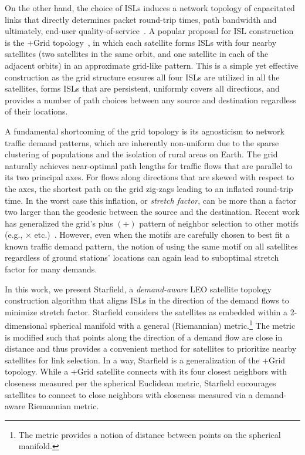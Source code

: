 \documentclass[acmsmall, screen]{acmart}
\begin{document}
On the other hand, the choice of ISLs induces a network topology of capacitated links that directly determines packet round-trip times, path bandwidth and ultimately, end-user quality-of-service~\cite{chen20243}. A popular proposal for ISL construction is the +Grid topology~\cite{wood2001internetworking}, in which each satellite forms ISLs with four nearby satellites (two satellites in the same orbit, and one satellite in each of the adjacent orbits) in an approximate grid-like pattern. This is a simple yet effective construction as the grid structure ensures all four ISLs are utilized in all the satellites, forms ISLs that are persistent, uniformly covers all directions, and provides a number of path choices between any source and destination regardless of their locations. 

A fundamental shortcoming of the grid topology is its agnosticism to network traffic demand patterns, which are inherently non-uniform due to the sparse clustering of populations and the isolation of rural areas on Earth. The grid naturally achieves near-optimal path lengths for traffic flows that are parallel to its two principal axes. For flows along directions that are skewed with respect to the axes, the shortest path on the grid zig-zags leading to an inflated round-trip time. In the worst case this inflation, or {\em stretch factor}, can be more than a factor two larger than the geodesic between the source and the destination. Recent work has generalized the grid's plus $(+)$ pattern of neighbor selection to other motifs (e.g., $\times$ etc.)~\cite{bhattacherjee2019network}. However, even when the motifs are carefully chosen to best fit a known traffic demand pattern, the notion of using the same motif on all satellites regardless of ground stations' locations can again lead to suboptimal stretch factor for many demands. 

In this work, we present Starfield, a {\em demand-aware} LEO satellite topology construction algorithm that aligns ISLs in the direction of the demand flows to minimize stretch factor. Starfield considers the satellites as embedded within a 2-dimensional spherical manifold with a general (Riemannian) metric.\footnote{The metric provides a notion of distance between points on the spherical manifold.} 
The metric is modified such that points along the direction of a demand flow are close in distance and thus provides a convenient method for satellites to prioritize nearby satellites for link selection. In a way, Starfield is a generalization of the +Grid topology. While a +Grid satellite connects with its four closest neighbors with closeness measured per the spherical Euclidean metric, Starfield encourages satellites to connect to close neighbors with closeness measured via a demand-aware Riemannian metric. 
\end{document}
